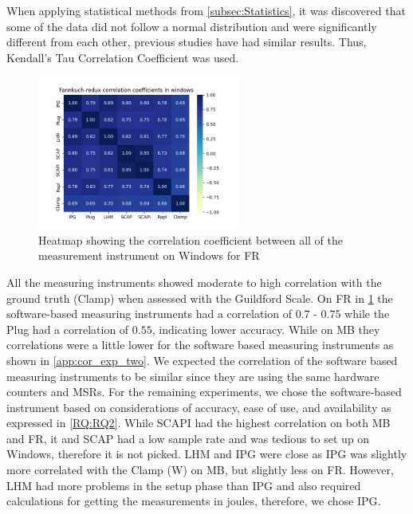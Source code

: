 


When applying statistical methods from \cref{subsec:Statistics}, it was discovered that some of the data did not follow a normal distribution and were significantly different from each other, previous studies \cite{biksbois, Koedijk2022diff} have had similar results. Thus, Kendall's Tau Correlation Coefficient was used.%

\begin{figure}[H]
    \centering
    \hspace*{-1cm} %
    \includegraphics[width=0.6\textwidth]{figures/Fannkuch-redux_ex2.png}
    \caption{Heatmap showing the correlation coefficient between all of the measurement instrument on Windows for FR}
    \label{fig:fannkuchCorr}
\end{figure}

All the measuring instruments showed moderate to high correlation with the ground truth (Clamp) when assessed with the Guildford Scale. On FR in \cref{fig:fannkuchCorr} the software-based measuring instruments had a correlation of $0.7$ - $0.75$ while the Plug had a correlation of $0.55$, indicating lower accuracy. While on MB they correlations were a little lower for the software based measuring instruments as shown in \cref{app:cor_exp_two}. We expected the correlation of the software based measuring instruments to be similar since they are using the same hardware counters and MSRs. For the remaining experiments, we chose the software-based instrument based on considerations of accuracy, ease of use, and availability as expressed in \cref{RQ:RQ2}. While SCAPI had the highest correlation on both MB and FR, it and SCAP had a low sample rate and was tedious to set up on Windows, therefore it is not picked. LHM and IPG were close as IPG was slightly more correlated with the Clamp (W) on MB, but slightly less on FR. However, LHM had more problems in the setup phase than IPG and also required calculations for getting the measurements in joules, therefore, we chose IPG. %